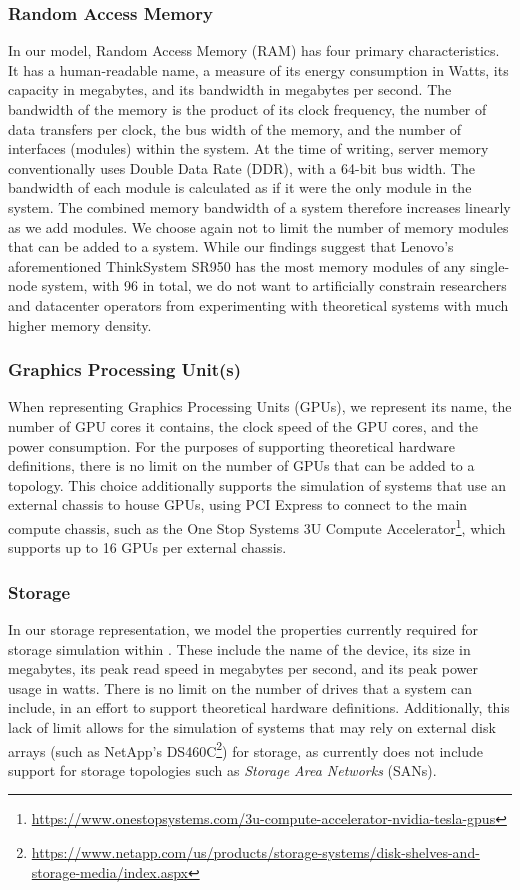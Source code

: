 \documentclass[11pt]{article}
\begin{document}
		\subsubsection{Random Access Memory}
			In our model, Random Access Memory (RAM) has four primary characteristics.
			It has a human-readable name, a measure of its energy consumption in Watts, its capacity in megabytes, and its bandwidth in megabytes per second.
			The bandwidth of the memory is the product of its clock frequency, the number of data transfers per clock, the bus width of the memory, and the number of interfaces (modules) within the system.
			At the time of writing, server memory conventionally uses Double Data Rate (DDR), with a 64-bit bus width.
			The bandwidth of each module is calculated as if it were the only module in the system.
			The combined memory bandwidth of a system therefore increases linearly as we add modules.
			We choose again not to limit the number of memory modules that can be added to a system.
			While our findings suggest that Lenovo's aforementioned ThinkSystem SR950 has the most memory modules of any single-node system, with 96 in total, we do not want to artificially constrain researchers and datacenter operators from experimenting with theoretical systems with much higher memory density.

		\subsubsection{Graphics Processing Unit(s)}
			When representing Graphics Processing Units (GPUs), we represent its name, the number of GPU cores it contains, the clock speed of the GPU cores, and the power consumption.
			For the purposes of supporting theoretical hardware definitions, there is no limit on the number of GPUs that can be added to a topology. 
			This choice additionally supports the simulation of systems that use an external chassis to house GPUs, using PCI Express to connect to the main compute chassis, such as the One Stop Systems 3U Compute Accelerator\footnote{\url{https://www.onestopsystems.com/3u-compute-accelerator-nvidia-tesla-gpus}}, which supports up to 16 GPUs per external chassis. 

		\subsubsection{Storage}
			In our storage representation, we model the properties currently required for storage simulation within \opendc{}.
			These include the name of the device, its size in megabytes, its peak read speed in megabytes per second, and its peak power usage in watts.
			There is no limit on the number of drives that a system can include, in an effort to support theoretical hardware definitions.
			Additionally, this lack of limit allows for the simulation of systems that may rely on external disk arrays (such as NetApp's DS460C\footnote{\url{https://www.netapp.com/us/products/storage-systems/disk-shelves-and-storage-media/index.aspx}}) for storage, as \opendc{} currently does not include support for storage topologies such as \textit{Storage Area Networks} (SANs).
	
\end{document}
